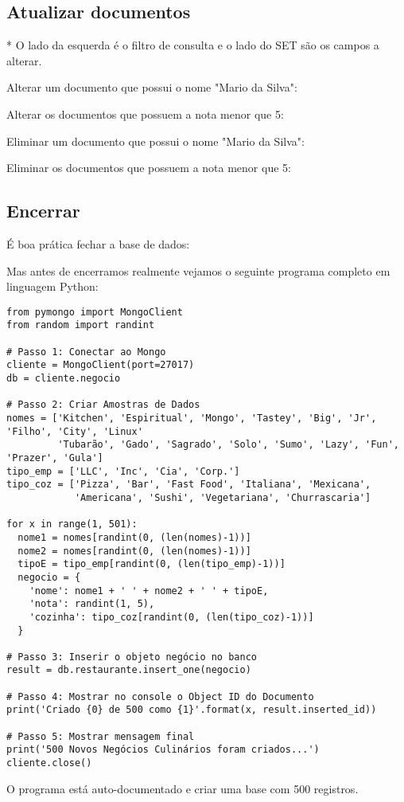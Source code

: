 \subsection{Atualizar documentos}
* O lado da esquerda é o filtro de consulta e o lado do SET são os campos a alterar.

Alterar um documento que possui o nome "Mario da Silva": \\

Alterar os documentos que possuem a nota menor que 5: \\

Eliminar um documento que possui o nome "Mario da Silva": \\

Eliminar os documentos que possuem a nota menor que 5: \\

\subsection{Encerrar}
É boa prática fechar a base de dados: \\

Mas antes de encerramos realmente vejamos o seguinte programa completo em linguagem Python:

\begin{lstlisting}[]
from pymongo import MongoClient
from random import randint

# Passo 1: Conectar ao Mongo
cliente = MongoClient(port=27017)
db = cliente.negocio

# Passo 2: Criar Amostras de Dados
nomes = ['Kitchen', 'Espiritual', 'Mongo', 'Tastey', 'Big', 'Jr', 'Filho', 'City', 'Linux'
         'Tubarão', 'Gado', 'Sagrado', 'Solo', 'Sumo', 'Lazy', 'Fun', 'Prazer', 'Gula']
tipo_emp = ['LLC', 'Inc', 'Cia', 'Corp.']
tipo_coz = ['Pizza', 'Bar', 'Fast Food', 'Italiana', 'Mexicana',
            'Americana', 'Sushi', 'Vegetariana', 'Churrascaria']

for x in range(1, 501):
  nome1 = nomes[randint(0, (len(nomes)-1))]
  nome2 = nomes[randint(0, (len(nomes)-1))]
  tipoE = tipo_emp[randint(0, (len(tipo_emp)-1))]
  negocio = {
	'nome': nome1 + ' ' + nome2 + ' ' + tipoE,
	'nota': randint(1, 5),
	'cozinha': tipo_coz[randint(0, (len(tipo_coz)-1))]
  }  

# Passo 3: Inserir o objeto negócio no banco
result = db.restaurante.insert_one(negocio)

# Passo 4: Mostrar no console o Object ID do Documento
print('Criado {0} de 500 como {1}'.format(x, result.inserted_id))

# Passo 5: Mostrar mensagem final
print('500 Novos Negócios Culinários foram criados...')
cliente.close()
\end{lstlisting}

O programa está auto-documentado e criar uma base com 500 registros.